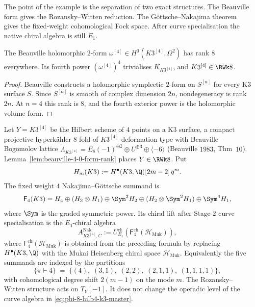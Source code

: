 The point of the example is the separation of two exact structures. The
Beauville form gives the Rozansky--Witten reduction. The
G\"ottsche--Nakajima theorem gives the fixed-weight cohomological Fock space.
After curve specialisation the native chiral algebra is still \(E_1\).

\begin{lemma}
\label{lem:beauville-4-0-form-rank}
%
The Beauville holomorphic \(2\)-form
\(\omega^{[4]}\in H^0(K3^{[4]},\Omega^2)\) has rank \(8\) everywhere.
Its fourth power \((\omega^{[4]})^4\) trivialises \(K_{K3^{[4]}}\), and
\(K3^{[4]}\in\RWk8\).
\end{lemma}

\begin{proof}
Beauville constructs a holomorphic symplectic \(2\)-form on \(S^{[n]}\) for
every K3 surface \(S\). Since \(S^{[n]}\) is smooth of complex dimension
\(2n\), nondegeneracy is rank \(2n\). At \(n=4\) this rank is \(8\), and
the fourth exterior power is the holomorphic volume form.
\end{proof}

\begin{theorem}
\label{thm:phi-8-hilb4-k3}
%
%
Let $Y = K3^{[4]}$ be the Hilbert scheme of $4$ points on a K$3$
surface, a compact projective hyperk\"ahler $8$-fold of
$K3^{[4]}$-deformation type with Beauville--Bogomolov lattice
$\widetilde\Lambda_{K3^{[4]}} = E_8(-1)^{\oplus 2} \oplus U^{\oplus 3}
\oplus \langle -6\rangle$ (Beauville $1983$, Thm~$10$).
Lemma~\ref{lem:beauville-4-0-form-rank} places \(Y\in\RWk8\). Put
\[
 H_m(K3):=H^\bullet(K3,\Q)[2m-2]\,q^m .
\]
The fixed weight \(4\) Nakajima--G\"ottsche summand is
\[
 \mathsf F_4(K3)
 = H_4 \oplus (H_3\otimes H_1)\oplus \Sym^2H_2
 \oplus (H_2\otimes\Sym^2H_1)\oplus \Sym^4H_1 ,
\]
where \(\Sym\) is the graded symmetric power. Its chiral lift after
Stage-$2$ curve specialisation is the \(E_1\)-chiral algebra
\begin{equation}
\label{eq:phi-8-hilb4-k3-master}
 A^{\mathrm{Nak}}_{K3^{[4]},C}
 := U^{\mathrm{ch}}_{E_1}\!\left(\mathsf F^{\mathrm{ch}}_4(\mathcal H_{\mathrm{Muk}})\right),
\end{equation}
where \(\mathsf F^{\mathrm{ch}}_4(\mathcal H_{\mathrm{Muk}})\) is obtained
from the preceding formula by replacing \(H^\bullet(K3,\Q)\) with the Mukai
Heisenberg chiral space \(\mathcal H_{\mathrm{Muk}}\). Equivalently the five
summands are indexed by the partitions
\[
 \{\pi \vdash 4\} \;=\; \bigl\{(4),\; (3,1),\; (2,2),\; (2,1,1),\;
 (1,1,1,1)\bigr\},
\]
with cohomological degree shift \(2(m-1)\) on the mode \(m\). The
Rozansky--Witten structure acts on \(T_Y[-1]\). It does not change the
operadic level of the curve algebra in \eqref{eq:phi-8-hilb4-k3-master}.
\end{theorem}

